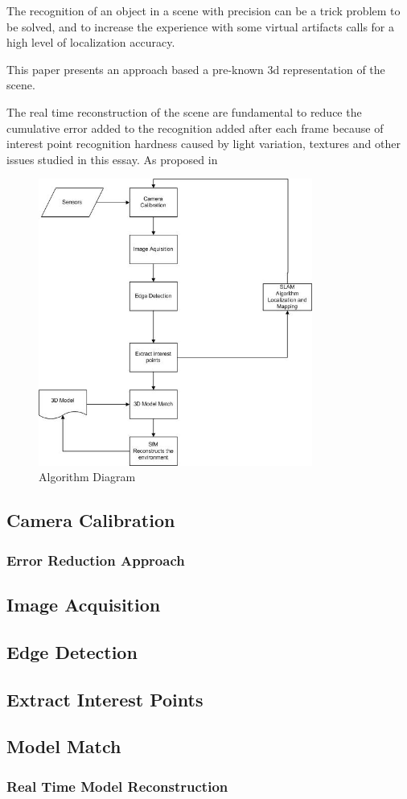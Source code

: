 The recognition of an object in a scene with precision can be a trick problem to be solved, and to increase the experience with some virtual artifacts calls for a high level of localization accuracy.

This paper presents an approach based a pre-known 3d representation of the scene.

The real time reconstruction of the scene are fundamental to reduce the cumulative error added to the recognition added after each frame because of interest point recognition hardness caused by light variation, textures and other issues studied in this essay.
As proposed in \cite{ISMAR2012}

\begin{figure}[ht!]
\centering
\includegraphics[width=90mm]{images/algorithm.jpg}
\caption{Algorithm Diagram}
\label{algorithm}
\end{figure}


\subsection{Camera Calibration}

\subsubsection{Error Reduction Approach}

\subsection{Image Acquisition}

\subsection{Edge Detection}

\subsection{Extract Interest Points}

\subsection{Model Match}

\subsubsection{Real Time Model Reconstruction}